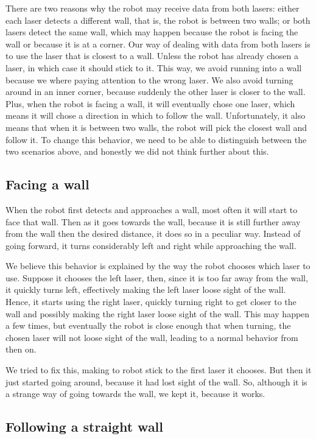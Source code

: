 \documentclass[10pt,journal,compsoc]{IEEEtran}
\begin{document}
There are two reasons why the robot may receive data from both lasers: either each laser detects a different wall, that is, the robot is between two walls; or both lasers detect the same wall, which may happen because the robot is facing the wall or because it is at a corner. Our way of dealing with data from both lasers is to use the laser that is closest to a wall. Unless the robot has already chosen a laser, in which case it should stick to it. This way, we avoid running into a wall because we where paying attention to the wrong laser. We also avoid turning around in an inner corner, because suddenly the other laser is closer to the wall. Plus, when the robot is facing a wall, it will eventually chose one laser, which means it will chose a direction in which to follow the wall. Unfortunately, it also means that when it is between two walls, the robot will pick the closest wall and follow it. To change this behavior, we need to be able to distinguish between the two scenarios above, and honestly we did not think further about this.

\subsection{Facing a wall}

When the robot first detects and approaches a wall, most often it will start to face that wall. Then as it goes towards the wall, because it is still further away from the wall then the desired distance, it does so in a peculiar way. Instead of going forward, it turns considerably left and right while approaching the wall.

We believe this behavior is explained by the way the robot chooses which laser to use. Suppose it chooses the left laser, then, since it is too far away from the wall, it quickly turns left, effectively making the left laser loose sight of the wall. Hence, it starts using the right laser, quickly turning right to get closer to the wall and possibly making the right laser loose sight of the wall. This may happen a few times, but eventually the robot is close enough that when turning, the chosen laser will not loose sight of the wall, leading to a normal behavior from then on.

We tried to fix this, making to robot stick to the first laser it chooses. But then it just started going around, because it had lost sight of the wall. So, although it is a strange way of going towards the wall, we kept it, because it works.

\subsection{Following a straight wall}
\end{document}
